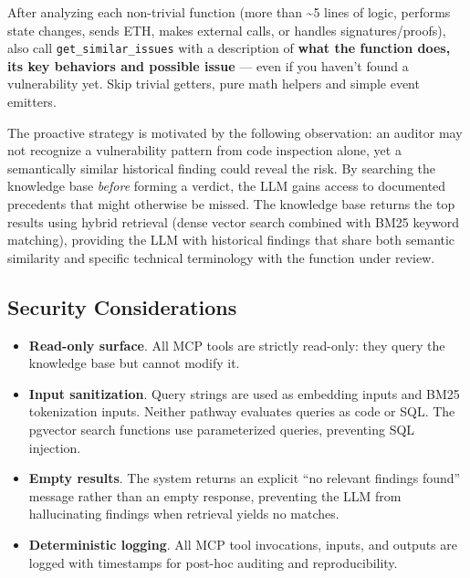 \begin{tcolorbox}[colback=gray!5, colframe=black!60, fonttitle=\bfseries, title=Prompt: Proactive RAG Instruction]
After analyzing each non-trivial function (more than \textasciitilde5 lines of logic, performs state changes, sends ETH, makes external calls, or handles signatures/proofs), also call \texttt{get\_similar\_issues} with a description of \textbf{what the function does, its key behaviors and possible issue} --- even if you haven't found a vulnerability yet. Skip trivial getters, pure math helpers and simple event emitters.
\end{tcolorbox}

The proactive strategy is motivated by the following observation: an auditor may not recognize a vulnerability pattern from code inspection alone, yet a semantically similar historical finding could reveal the risk. By searching the knowledge base \emph{before} forming a verdict, the LLM gains access to documented precedents that might otherwise be missed. The knowledge base returns the top results using hybrid retrieval (dense vector search combined with BM25 keyword matching), providing the LLM with historical findings that share both semantic similarity and specific technical terminology with the function under review.

\subsection{Security Considerations}
\label{subsec:mcp-security}

\begin{itemize}
    \item \textbf{Read-only surface}. All MCP tools are strictly read-only: they query the knowledge base but cannot modify it.

    \item \textbf{Input sanitization}. Query strings are used as embedding inputs and BM25 tokenization inputs. Neither pathway evaluates queries as code or SQL. The pgvector search functions use parameterized queries, preventing SQL injection.

    \item \textbf{Empty results}. The system returns an explicit ``no relevant findings found'' message rather than an empty response, preventing the LLM from hallucinating findings when retrieval yields no matches.

    \item \textbf{Deterministic logging}. All MCP tool invocations, inputs, and outputs are logged with timestamps for post-hoc auditing and reproducibility.
\end{itemize}


